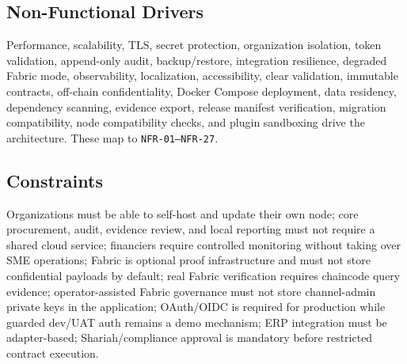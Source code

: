 \documentclass[11pt,a4paper]{article}
\newcommand{\req}[1]{\texttt{#1}}
\begin{document}
\subsection{Non-Functional Drivers}
Performance, scalability, TLS, secret protection, organization isolation, token validation, append-only audit, backup/restore, integration resilience, degraded Fabric mode, observability, localization, accessibility, clear validation, immutable contracts, off-chain confidentiality, Docker Compose deployment, data residency, dependency scanning, evidence export, release manifest verification, migration compatibility, node compatibility checks, and plugin sandboxing drive the architecture. These map to \req{NFR-01--NFR-27}.

\subsection{Constraints}
Organizations must be able to self-host and update their own node; core procurement, audit, evidence review, and local reporting must not require a shared cloud service; financiers require controlled monitoring without taking over SME operations; Fabric is optional proof infrastructure and must not store confidential payloads by default; real Fabric verification requires chaincode query evidence; operator-assisted Fabric governance must not store channel-admin private keys in the application; OAuth/OIDC is required for production while guarded dev/UAT auth remains a demo mechanism; ERP integration must be adapter-based; Shariah/compliance approval is mandatory before restricted contract execution.
\end{document}
